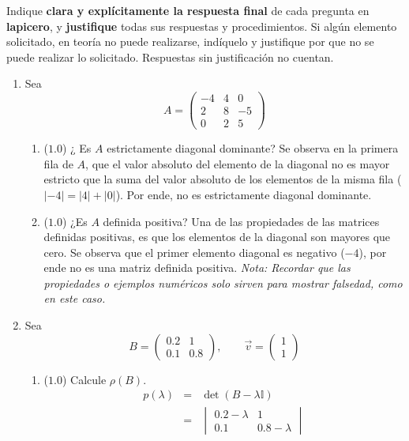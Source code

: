 \documentclass[12pt]{article}
\newcommand{\I}{\ensuremath{\mathbb{I}}}
\begin{document}
Indique \textbf{clara y explícitamente la respuesta final} de cada pregunta en \textbf{lapicero}, y \textbf{justifique} todas sus respuestas y procedimientos. Si algún elemento solicitado, en teoría no puede realizarse, indíquelo y justifique por que no se puede realizar lo solicitado. Respuestas sin justificación no cuentan.
  \begin{enumerate}[leftmargin=*,widest=9]
    \item Sea
    \[
    A = \begin{pmatrix}
    -4 & 4 & 0\\ 2 & 8 & -5\\ 0 & 2 & 5
    \end{pmatrix}
    \]     
    \begin{enumerate}[label=\alph*]
    \item (\(1.0\)) ¿ Es \(A\) estrictamente diagonal dominante?
    Se observa en la primera fila de \(A\), que el valor absoluto del elemento de la diagonal no es mayor estricto que la suma del valor absoluto de los elementos de la misma fila ( \(|-4| = |4|+|0|\)). Por ende, no es estrictamente diagonal dominante.
    \item (\(1.0\)) ¿Es \(A\) definida positiva?
Una de las propiedades de las matrices definidas positivas, es que los elementos de la diagonal son mayores que cero. Se observa que el primer elemento diagonal es negativo (\(-4\)), por ende no es una matriz definida positiva.
\textit{Nota: Recordar que las propiedades o ejemplos numéricos solo sirven para mostrar falsedad, como en este caso.}
    \end{enumerate}
    \item Sea
    \[
    B = \begin{pmatrix}
    0.2 & 1 \\ 0.1 & 0.8
    \end{pmatrix}, \qquad \vec{v} = \begin{pmatrix}
    1 \\ 1
    \end{pmatrix}
    \] 
    \begin{enumerate}[label=\alph*]
    \item (\(1.0\)) Calcule \(\rho (B)\).
    \begin{eqnarray*}
    p(\lambda) &=& \det(B - \lambda\I)\\
    & = & \begin{vmatrix}
    0.2-\lambda & 1\\ 0.1 & 0.8-\lambda

\end{vmatrix}
\end{eqnarray*}
\end{enumerate}
\end{enumerate}
\end{document}
